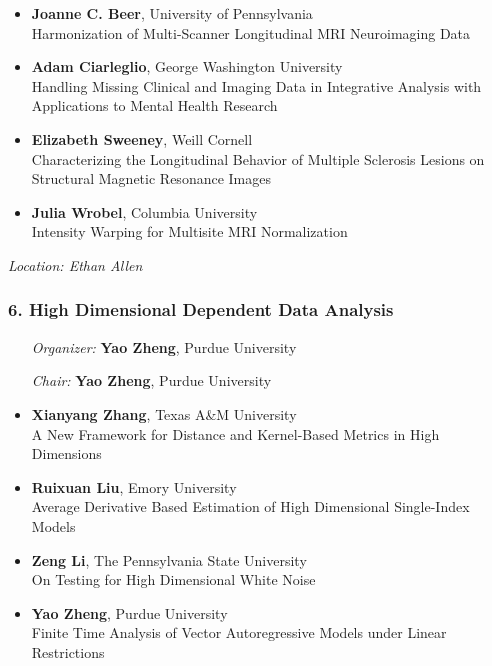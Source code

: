 \begin{itemize}
\item \textbf{Joanne C. Beer}, University of Pennsylvania \\
Harmonization of Multi-Scanner Longitudinal MRI Neuroimaging Data
\item \textbf{Adam Ciarleglio}, George Washington University \\
Handling Missing Clinical and Imaging Data in Integrative Analysis with Applications to Mental Health Research
\item \textbf{Elizabeth Sweeney}, Weill Cornell \\
Characterizing the Longitudinal Behavior of Multiple Sclerosis Lesions on Structural Magnetic Resonance Images
\item \textbf{Julia Wrobel}, Columbia University \\
Intensity Warping for Multisite MRI Normalization
\end{itemize}

\emph{Location: Ethan Allen}

\subsubsection*{6. High Dimensional Dependent Data Analysis}

\begin{enumerate}[align=left]
\item [\emph{Organizer:}] \textbf{Yao Zheng}, Purdue University
\item [\emph{Chair:}] \textbf{Yao Zheng}, Purdue University
\end{enumerate}

\begin{itemize}
\item \textbf{Xianyang Zhang}, Texas A\&M University \\
A New Framework for Distance and Kernel-Based Metrics in High Dimensions
\item \textbf{Ruixuan Liu}, Emory University \\
Average Derivative Based Estimation of High Dimensional Single-Index Models
\item \textbf{Zeng Li}, The Pennsylvania State University \\
On Testing for High Dimensional White Noise
\item \textbf{Yao Zheng}, Purdue University \\
Finite Time Analysis of Vector Autoregressive Models under Linear Restrictions
\end{itemize}


